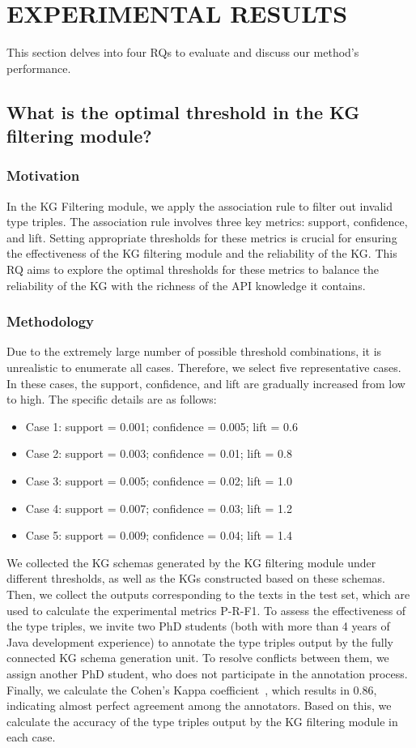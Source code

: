 \section{EXPERIMENTAL RESULTS}
This section delves into four RQs to evaluate and discuss our method’s performance.

\subsection{What is the optimal threshold in the KG filtering module?}\label{sec: RQ1}
\subsubsection{Motivation}
In the KG Filtering module, we apply the association rule to filter out invalid type triples.
The association rule involves three key metrics: support, confidence, and lift.
Setting appropriate thresholds for these metrics is crucial for ensuring the effectiveness of the KG filtering module and the reliability of the KG.
This RQ aims to explore the optimal thresholds for these metrics to balance the reliability of the KG with the richness of the API knowledge it contains.

\subsubsection{Methodology}
Due to the extremely large number of possible threshold combinations, it is unrealistic to enumerate all cases. Therefore, we select five representative cases.
In these cases, the support, confidence, and lift are gradually increased from low to high.
The specific details are as follows:
\begin{itemize}[leftmargin=*]
\item Case 1: support = 0.001; confidence = 0.005; lift = 0.6
\item Case 2: support = 0.003; confidence = 0.01;  lift = 0.8
\item Case 3: support = 0.005; confidence = 0.02;  lift = 1.0
\item Case 4: support = 0.007; confidence = 0.03;  lift = 1.2
\item Case 5: support = 0.009; confidence = 0.04;  lift = 1.4
\end{itemize}

We collected the KG schemas generated by the KG filtering module under different thresholds, as well as the KGs constructed based on these schemas.
Then, we collect the outputs corresponding to the texts in the test set, which are used to calculate the experimental metrics P-R-F1.
To assess the effectiveness of the type triples, we invite two PhD students (both with more than 4 years of Java development experience) to annotate the type triples output by the fully connected KG schema generation unit.
To resolve conflicts between them, we assign another PhD student, who does not participate in the annotation process.
Finally, we calculate the Cohen's Kappa coefficient~\cite{Cohen1960ACO}, which results in 0.86, indicating almost perfect agreement among the annotators.
Based on this, we calculate the accuracy of the type triples output by the KG filtering module in each case. 


